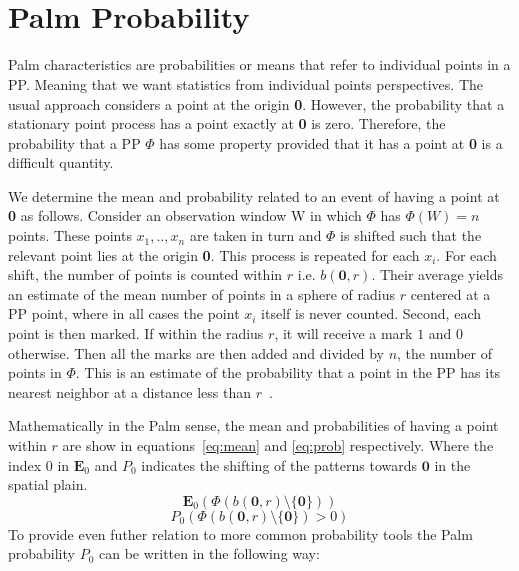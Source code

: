 \section{\\ Palm Probability}\label{app:AppendixA}
%
Palm characteristics are probabilities or means that refer to individual points in a PP.  Meaning that we want statistics from individual points perspectives.  The usual approach considers a point at the origin \textbf{0}. However, the probability that a stationary point process has a point exactly at \textbf{0} is zero. Therefore, the probability that a PP $\Phi$ has some property provided that it has a point at \textbf{0} is a difficult quantity.
\par
%
We determine the mean and probability related to an event of having a point at \textbf{0} as follows.  Consider an observation window W in which $\Phi$ has $\Phi(W) = n$ points. These points $x_1,..,x_n$ are taken in turn and $\Phi$ is shifted such that the relevant point lies at the origin \textbf{0}.  This process is repeated for each $x_i$.  For each shift, the number of points is counted within $r$ i.e. $b(\textbf{0},r)$.  Their average yields an estimate of the mean number of points in a sphere of radius $r$ centered at a PP point, where in all cases the point $x_i$ itself is never counted.  Second, each point is then marked.  If within the radius $r$, it will receive a mark $1$ and $0$ otherwise.  Then all the marks are then added and divided by $n$, the number of points in $\Phi$.  This is an estimate of the probability that a point in the PP has its nearest neighbor at a distance less than $r$~\cite{Illian2008}.
\par
%
Mathematically in the Palm sense, the mean and probabilities of having a point within $r$ are show in equations~\eqref{eq:mean} and \eqref{eq:prob} respectively.  Where the index $0$ in $\textbf{E}_0$ and $P_0$ indicates the shifting of the patterns towards $\textbf{0}$ in the spatial plain.
%
\begin{equation}\label{eq:mean}
  \textbf{E}_0(\Phi(b(\textbf{0},r) \setminus \{\textbf{0}\}))
\end{equation}
\begin{equation}\label{eq:prob}
  P_0(\Phi(b(\textbf{0},r) \setminus \{\textbf{0}\})>0)
\end{equation}
%
To provide even futher relation to more common probability tools the Palm probability $P_{0}$ can be written in the following way:
